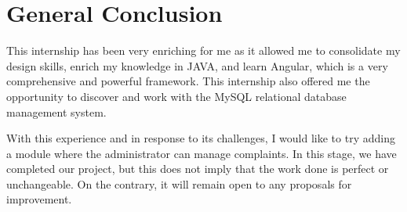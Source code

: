 \chapter*{General Conclusion}
This internship has been very enriching for me as it allowed me to consolidate my design skills, enrich my knowledge in JAVA, and learn Angular, which is a very comprehensive and powerful framework. This internship also offered me the opportunity to discover and work with the MySQL relational database management system.

With this experience and in response to its challenges, I would like to try adding a module where the administrator can manage complaints. In this stage, we have completed our project, but this does not imply that the work done is perfect or unchangeable. On the contrary, it will remain open to any proposals for improvement.

 

 

